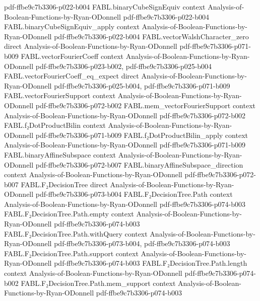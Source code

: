 \begin{theorem}
  {pdf-ffbe9c7b3306-p022-b004}
\proofstep
  {FABL.binaryCubeSignEquiv}
  {context}
  {Analysis-of-Boolean-Functions-by-Ryan-ODonnell}
  {pdf-ffbe9c7b3306-p022-b004}
\proofstep
  {FABL.binaryCubeSignEquiv_apply}
  {context}
  {Analysis-of-Boolean-Functions-by-Ryan-ODonnell}
  {pdf-ffbe9c7b3306-p022-b004}
\proofstep
  {FABL.vectorWalshCharacter_zero}
  {direct}
  {Analysis-of-Boolean-Functions-by-Ryan-ODonnell}
  {pdf-ffbe9c7b3306-p071-b009}
\proofstep
  {FABL.vectorFourierCoeff}
  {context}
  {Analysis-of-Boolean-Functions-by-Ryan-ODonnell}
  {pdf-ffbe9c7b3306-p023-b002,
    pdf-ffbe9c7b3306-p025-b004}
\proofstep
  {FABL.vectorFourierCoeff_eq_expect}
  {direct}
  {Analysis-of-Boolean-Functions-by-Ryan-ODonnell}
  {pdf-ffbe9c7b3306-p025-b004,
    pdf-ffbe9c7b3306-p071-b009}
\proofstep
  {FABL.vectorFourierSupport}
  {context}
  {Analysis-of-Boolean-Functions-by-Ryan-ODonnell}
  {pdf-ffbe9c7b3306-p072-b002}
\proofstep
  {FABL.mem_vectorFourierSupport}
  {context}
  {Analysis-of-Boolean-Functions-by-Ryan-ODonnell}
  {pdf-ffbe9c7b3306-p072-b002}
\proofstep
  {FABL.f₂DotProductBilin}
  {context}
  {Analysis-of-Boolean-Functions-by-Ryan-ODonnell}
  {pdf-ffbe9c7b3306-p071-b009}
\proofstep
  {FABL.f₂DotProductBilin_apply}
  {context}
  {Analysis-of-Boolean-Functions-by-Ryan-ODonnell}
  {pdf-ffbe9c7b3306-p071-b009}
\proofstep
  {FABL.binaryAffineSubspace}
  {context}
  {Analysis-of-Boolean-Functions-by-Ryan-ODonnell}
  {pdf-ffbe9c7b3306-p072-b007}
\proofstep
  {FABL.binaryAffineSubspace_direction}
  {context}
  {Analysis-of-Boolean-Functions-by-Ryan-ODonnell}
  {pdf-ffbe9c7b3306-p072-b007}
\proofstep
  {FABL.F₂DecisionTree}
  {direct}
  {Analysis-of-Boolean-Functions-by-Ryan-ODonnell}
  {pdf-ffbe9c7b3306-p073-b004}
\proofstep
  {FABL.F₂DecisionTree.Path}
  {context}
  {Analysis-of-Boolean-Functions-by-Ryan-ODonnell}
  {pdf-ffbe9c7b3306-p074-b003}
\proofstep
  {FABL.F₂DecisionTree.Path.empty}
  {context}
  {Analysis-of-Boolean-Functions-by-Ryan-ODonnell}
  {pdf-ffbe9c7b3306-p074-b003}
\proofstep
  {FABL.F₂DecisionTree.Path.withQuery}
  {context}
  {Analysis-of-Boolean-Functions-by-Ryan-ODonnell}
  {pdf-ffbe9c7b3306-p073-b004,
    pdf-ffbe9c7b3306-p074-b003}
\proofstep
  {FABL.F₂DecisionTree.Path.support}
  {context}
  {Analysis-of-Boolean-Functions-by-Ryan-ODonnell}
  {pdf-ffbe9c7b3306-p074-b003}
\proofstep
  {FABL.F₂DecisionTree.Path.length}
  {context}
  {Analysis-of-Boolean-Functions-by-Ryan-ODonnell}
  {pdf-ffbe9c7b3306-p074-b002}
\proofstep
  {FABL.F₂DecisionTree.Path.mem_support}
  {context}
  {Analysis-of-Boolean-Functions-by-Ryan-ODonnell}
  {pdf-ffbe9c7b3306-p074-b003}

\end{theorem}
